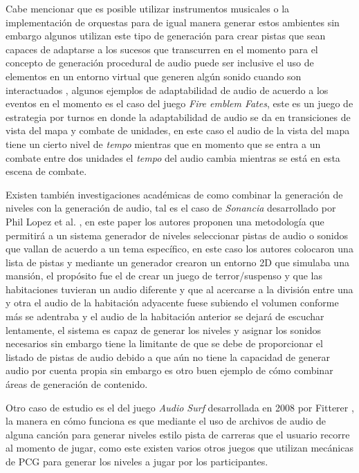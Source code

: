 Cabe mencionar que es posible utilizar instrumentos musicales o la
implementación de orquestas para de igual manera generar estos ambientes sin
embargo algunos utilizan este tipo de generación para crear pistas que sean
capaces de adaptarse a los sucesos que transcurren en el momento para el
concepto de generación procedural de audio puede ser inclusive el uso de
elementos en un entorno virtual que generen algún sonido cuando son
interactuados \cite{garner2014sonic}, algunos ejemplos de adaptabilidad de audio
de acuerdo a los eventos en el momento es el caso del juego \textit{Fire emblem
Fates}, este es un juego de estrategia por turnos en donde la adaptabilidad de
audio se da en transiciones de vista del mapa y combate de unidades, en este
caso el audio de la vista del mapa tiene un cierto nivel de \textit{tempo}
mientras que en momento que se entra a un combate entre dos unidades el
\textit{tempo} del audio cambia mientras se está en esta escena de combate.

Existen también investigaciones académicas de como combinar la generación de
niveles con la generación de audio, tal es el caso de \textit{Sonancia}
desarrollado por Phil Lopez et al. \cite{lopes2015sonancia}, en este paper los
autores proponen una metodología que permitirá a un sistema generador de niveles
seleccionar pistas de audio o sonidos que vallan de acuerdo a un tema específico,
en este caso los autores colocaron una lista de pistas y mediante un generador
crearon un entorno 2D que simulaba una mansión, el propósito fue el de crear un
juego de terror/suspenso y que las habitaciones tuvieran un audio diferente y
que al acercarse a la división entre una y otra el audio de la habitación
adyacente fuese subiendo el volumen conforme más se adentraba y el audio de la
habitación anterior se dejará de escuchar lentamente, el sistema es capaz de
generar los niveles y asignar los sonidos necesarios sin embargo tiene la
limitante de que se debe de proporcionar el listado de pistas de audio debido a
que aún no tiene la capacidad de generar audio por cuenta propia sin embargo es
otro buen ejemplo de cómo combinar áreas de generación de contenido.

Otro caso de estudio es el del juego \textit{Audio Surf} desarrollada en 2008 por
Fitterer \cite{DylanFitterer2010}, la manera en cómo funciona es que mediante el uso de archivos de audio
de alguna canción para generar niveles estilo pista de carreras que el usuario
recorre al momento de jugar, como este existen varios otros juegos que utilizan
mecánicas de PCG para generar los niveles a jugar por los participantes.


